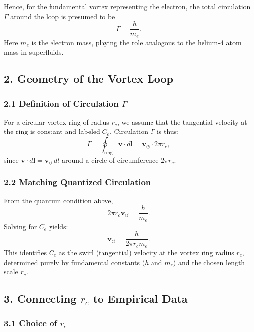 \documentclass[a4paper,12pt]{article}
\begin{document}
Hence, for the fundamental vortex representing the electron, the total circulation \(\Gamma\) around the loop is presumed to be
\[
    \Gamma = \frac{h}{m_e}.
\]
Here \(m_e\) is the electron mass, playing the role analogous to the helium-4 atom mass in superfluids.

\subsection*{2. Geometry of the Vortex Loop}

\subsubsection*{2.1 Definition of Circulation \(\Gamma\)}

For a circular vortex ring of radius \(r_c\), we assume that the tangential velocity at the ring is constant and labeled \(C_e\). Circulation \(\Gamma\) is thus:
\[
    \Gamma = \oint_\text{ring} \mathbf{v} \cdot d\mathbf{l} = \mathbf{v}_{\scriptscriptstyle\boldsymbol{\circlearrowleft}} \cdot 2 \pi r_c,
\]
since \(\mathbf{v} \cdot d\mathbf{l} = \mathbf{v}_{\scriptscriptstyle\boldsymbol{\circlearrowleft}} \,dl\) around a circle of circumference \(2\pi r_c\).

\subsubsection*{2.2 Matching Quantized Circulation}

From the quantum condition above,
\[
    2 \pi r_c \mathbf{v}_{\scriptscriptstyle\boldsymbol{\circlearrowleft}} = \frac{h}{m_e}.
\]
Solving for \(C_e\) yields:
\[
    \mathbf{v}_{\scriptscriptstyle\boldsymbol{\circlearrowleft}} = \frac{h}{2 \pi r_c m_e}.
\]
This identifies \(C_e\) as the swirl (tangential) velocity at the vortex ring radius \(r_c\), determined purely by fundamental constants (\(h\) and \(m_e\)) and the chosen length scale \(r_c\).

\subsection*{3. Connecting \(r_c\) to Empirical Data}

\subsubsection*{3.1 Choice of \(r_c\)}
\end{document}
